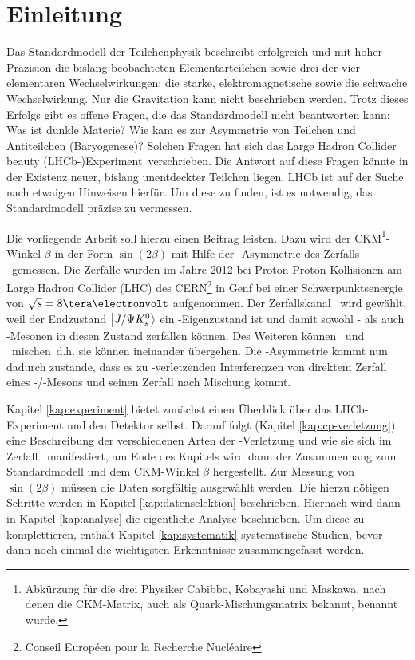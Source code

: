 \chapter{Einleitung}
Das Standardmodell der Teilchenphysik beschreibt erfolgreich und mit hoher Präzision die bislang beobachteten Elementarteilchen sowie drei der vier elementaren Wechselwirkungen: die starke, elektromagnetische sowie die schwache Wechselwirkung. Nur die Gravitation kann nicht beschrieben werden. Trotz dieses Erfolgs gibt es offene Fragen, die das Standardmodell nicht beantworten kann: Was ist dunkle Materie? Wie kam es zur Asymmetrie von Teilchen und Antiteilchen (Baryogenese)? Solchen Fragen hat sich das \glqq Large Hadron Collider beauty (LHCb-)Experiment\grqq\ verschrieben. Die Antwort auf diese Fragen könnte in der Existenz neuer, bislang unentdeckter Teilchen liegen. LHCb ist auf der Suche nach etwaigen Hinweisen hierfür.  Um diese zu finden, ist es notwendig, das Standardmodell präzise zu vermessen. \cite{cern-courier, roadmap}

Die vorliegende Arbeit soll hierzu einen Beitrag leisten. Dazu wird der CKM\footnote{Abkürzung für die drei Physiker Cabibbo, Kobayashi und Maskawa, nach denen die CKM-Matrix, auch als Quark-Mischungsmatrix bekannt, benannt wurde.}-Winkel $\beta$ in der Form $\sin(2\beta)$ mit Hilfe der \CP-Asymmetrie des Zerfalls \Decaychannel\ gemessen. Die Zerfälle wurden im Jahre 2012 bei Proton-Proton-Kollisionen am Large Hadron Collider (LHC) des CERN\footnote{Conseil Européen pour la Recherche Nucléaire} in Genf bei einer Schwerpunktsenergie von $\sqrt{s}=8\tera\electronvolt$ aufgenommen. Der Zerfallskanal \Decaychannel\ wird gewählt, weil der Endzustand $\Ket{J/\Psi K_s^0}$ ein \CP-Eigenzustand ist und damit sowohl \Bd- als auch \Bdbar-Mesonen in diesen Zustand zerfallen können. Des Weiteren können \Bd\ und \Bdbar\ \glqq mischen\grqq\, d.h. sie können ineinander übergehen. Die \CP-Asymmetrie kommt nun dadurch zustande, dass es zu \CP-verletzenden Interferenzen von direktem Zerfall eines \Bd-/\Bdbar-Mesons und seinen Zerfall nach Mischung kommt.

Kapitel \ref{kap:experiment} bietet zunächst einen Überblick über das LHCb-Experiment und den Detektor selbst. Darauf folgt (Kapitel \ref{kap:cp-verletzung}) eine Beschreibung der verschiedenen Arten der \CP-Verletzung und wie sie sich im Zerfall \Decaychannel\ manifestiert, am Ende des Kapitels wird dann der Zusammenhang zum Standardmodell und dem CKM-Winkel $\beta$ hergestellt. Zur Messung von $\sin(2\beta)$ müssen die Daten sorgfältig ausgewählt werden. Die hierzu nötigen Schritte werden in Kapitel \ref{kap:datenselektion} beschrieben. Hiernach wird dann in Kapitel \ref{kap:analyse} die eigentliche Analyse beschrieben. Um diese zu komplettieren, enthält Kapitel \ref{kap:systematik} systematische Studien, bevor dann noch einmal die wichtigsten Erkenntnisse zusammengefasst werden.